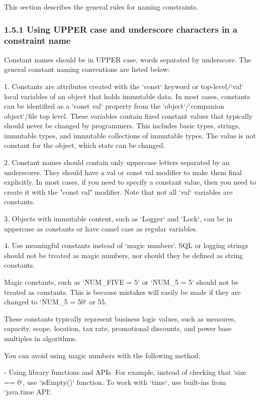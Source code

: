 This section describes the general rules for naming constraints.

\subsubsection*{\textbf{1.5.1 Using UPPER case and underscore characters in a constraint name}}
\leavevmode\newline

Constant names should be in UPPER case, words separated by underscore. The general constant naming conventions are listed below:

1. Constants are attributes created with the `const` keyword or top-level/`val` local variables of an object that holds immutable data. In most cases, constants can be identified as a `const val` property from the `object`/`companion object`/file top level. These variables contain fixed constant values that typically should never be changed by programmers. This includes basic types, strings, immutable types, and immutable collections of immutable types. The value is not constant for the object, which state can be changed.

2. Constant names should contain only uppercase letters separated by an underscores. They should have a val or const val modifier to make them final explicitly. In most cases, if you need to specify a constant value, then you need to create it with the "const val" modifier. Note that not all `val` variables are constants.

3. Objects with immutable content, such as `Logger` and `Lock`, can be in uppercase as constants or have camel case as regular variables.

4. Use meaningful constants instead of `magic numbers`. SQL or logging strings should not be treated as magic numbers, nor should they be defined as string constants.

Magic constants, such as `NUM_FIVE = 5` or `NUM_5 = 5` should not be treated as constants. This is because mistakes will easily be made if they are changed to `NUM_5 = 50` or 55.

These constants typically represent business logic values, such as measures, capacity, scope, location, tax rate, promotional discounts, and power base multiples in algorithms.

You can avoid using magic numbers with the following method:

- Using library functions and APIs. For example, instead of checking that `size == 0`, use `isEmpty()` function. To work with `time`, use built-ins from `java.time API`.

